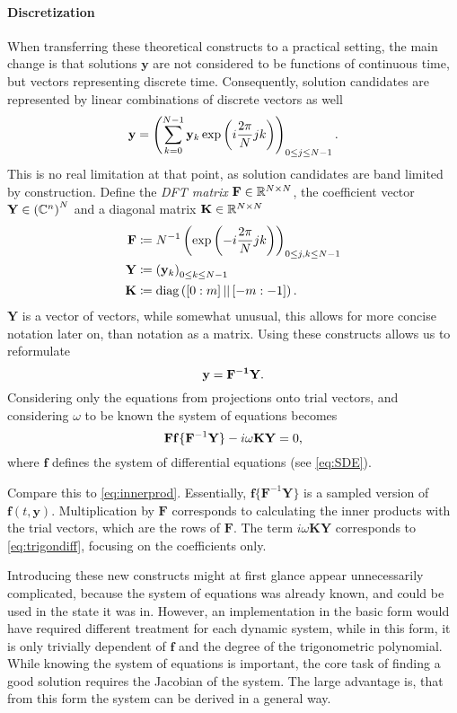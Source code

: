 \paragraph{Discretization} When transferring these theoretical constructs to a practical setting, the main change is that solutions $\mathbf{y}$ are not considered to be functions of continuous time, but vectors representing discrete time.
Consequently, solution candidates are represented by linear combinations of discrete vectors as well
	\[
		\mathbf{\mathbf{y}} = \left( \sum_{k=0}^{N-1} \mathbf{y}_k \exp\left(i \frac{2\pi}{N} j k\right) \right)_{0 \le j \le N-1} \text.
	\]
This is no real limitation at that point, as solution candidates are band limited by construction.
Define the \emph{DFT matrix} $\mathbf F \in \mathbb{R}^{N \times N}$, the coefficient vector $\mathbf Y \in \left(\mathbb{C}^n\right)^N$ and a diagonal matrix $\mathbf K \in \mathbb{R}^{N\times N}$
	\begin{align*}
		\mathbf{F} &\coloneqq N^{-1} \left( \exp\left(-i \frac{2\pi}{N} j k \right) \right)_{0 \le j,k \le N-1} \\
		\mathbf{Y} &\coloneqq \left(\mathbf{y}_k\right)_{0 \le k \le N-1} \\
		\mathbf K &\coloneqq \operatorname{diag}\left( [0:m]\, ||\, [-m:-1] \right) \text.
	\end{align*}
$\mathbf Y$ is a vector of vectors, while somewhat unusual, this allows for more concise notation later on, than notation as a matrix.
Using these constructs allows us to reformulate
	\[
			\mathbf{y} = \mathbf{F^{-1}} \mathbf{Y} \text.
	\]
Considering only the equations from projections onto trial vectors, and considering $\omega$ to be known the system of equations becomes %
	\[
		\mathbf{F} \mathbf{f}\{\mathbf F^{-1} \mathbf{Y}\} - i \omega \mathbf K \mathbf Y = 0\text,
	\]
where $\mathbf{f}$ defines the system of differential equations (see \autoref{eq:SDE}).

Compare this to \autoref{eq:innerprod}.
Essentially, $\mathbf{f}\{\mathbf F^{-1} \mathbf{Y}\}$ is a sampled version of $\mathbf f(t,\mathbf y)$.
Multiplication by $\mathbf F$ corresponds to calculating the inner products with the trial vectors, which are the rows of $\mathbf F$.
The term $i \omega \mathbf K \mathbf Y$ corresponds to \autoref{eq:trigondiff}, focusing on the coefficients only.

Introducing these new constructs might at first glance appear unnecessarily complicated, because the system of equations was already known, and could be used in the state it was in.
However, an implementation in the basic form would have required different treatment for each dynamic system, while in this form, it is only trivially dependent of $\mathbf f$ and the degree of the trigonometric polynomial.
While knowing the system of equations is important, the core task of finding a good solution requires the Jacobian of the system.
The large advantage is, that from this form the system can be derived in a general way.

